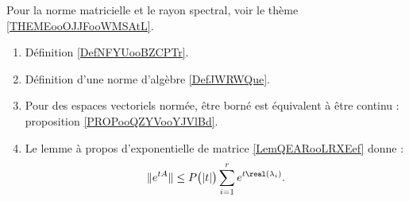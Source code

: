 
         \label{THEMEooHSLLooBQpFAr}
    Pour la norme matricielle et le rayon spectral, voir le thème \ref{THEMEooOJJFooWMSAtL}.
    \begin{enumerate}
        \item
            Définition \ref{DefNFYUooBZCPTr}.
        \item 
            Définition d'une norme d'algèbre \ref{DefJWRWQue}.
        \item
            Pour des espaces vectoriels normée, être borné est équivalent à être continu : proposition \ref{PROPooQZYVooYJVlBd}.
        \item
            Le lemme à propos d'exponentielle de matrice \ref{LemQEARooLRXEef} donne :
            \begin{equation}
                \|  e^{tA} \|\leq P\big( | t | \big)\sum_{i=1}^r e^{t\real(\lambda_i)}.
            \end{equation}
    \end{enumerate}


